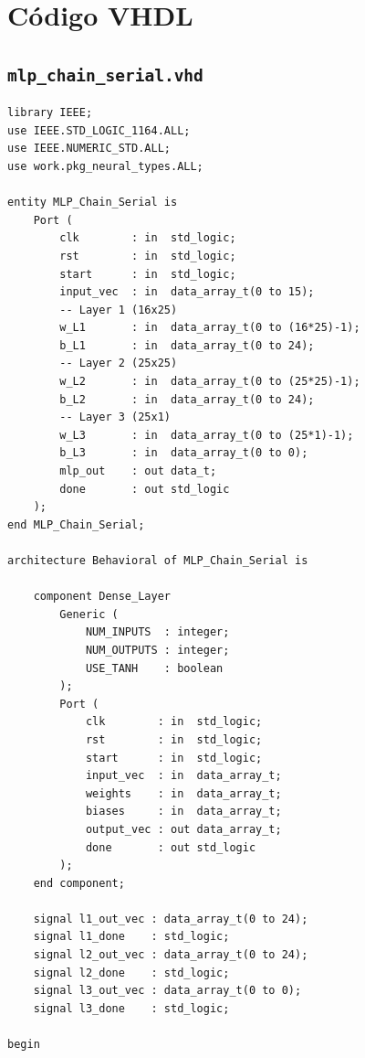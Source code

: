 \documentclass[a4paper,12pt]{article}
\begin{document}
\section{C\'odigo VHDL}

\subsection{\texttt{mlp\_chain\_serial.vhd}}

\begin{lstlisting}[style=vhdlstyle,
    caption={C\'odigo VHDL do \texttt{MLP\_Chain\_Serial}.},
    label={lst:mlp_chain}]
library IEEE;
use IEEE.STD_LOGIC_1164.ALL;
use IEEE.NUMERIC_STD.ALL;
use work.pkg_neural_types.ALL;

entity MLP_Chain_Serial is
    Port (
        clk        : in  std_logic;
        rst        : in  std_logic;
        start      : in  std_logic;
        input_vec  : in  data_array_t(0 to 15);
        -- Layer 1 (16x25)
        w_L1       : in  data_array_t(0 to (16*25)-1);
        b_L1       : in  data_array_t(0 to 24);
        -- Layer 2 (25x25)
        w_L2       : in  data_array_t(0 to (25*25)-1);
        b_L2       : in  data_array_t(0 to 24);
        -- Layer 3 (25x1)
        w_L3       : in  data_array_t(0 to (25*1)-1);
        b_L3       : in  data_array_t(0 to 0);
        mlp_out    : out data_t;
        done       : out std_logic
    );
end MLP_Chain_Serial;

architecture Behavioral of MLP_Chain_Serial is

    component Dense_Layer
        Generic (
            NUM_INPUTS  : integer;
            NUM_OUTPUTS : integer;
            USE_TANH    : boolean
        );
        Port (
            clk        : in  std_logic;
            rst        : in  std_logic;
            start      : in  std_logic;
            input_vec  : in  data_array_t;
            weights    : in  data_array_t;
            biases     : in  data_array_t;
            output_vec : out data_array_t;
            done       : out std_logic
        );
    end component;

    signal l1_out_vec : data_array_t(0 to 24);
    signal l1_done    : std_logic;
    signal l2_out_vec : data_array_t(0 to 24);
    signal l2_done    : std_logic;
    signal l3_out_vec : data_array_t(0 to 0);
    signal l3_done    : std_logic;

begin


\end{lstlisting}
\end{document}
